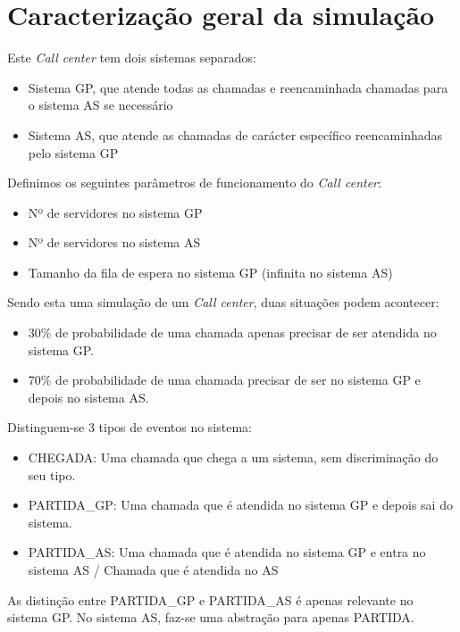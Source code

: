 \section*{Caracterização geral da simulação}

\noindent
Este \textit{Call center} tem dois sistemas separados:
\begin{itemize}
    \item Sistema GP, que atende todas as chamadas e reencaminhada chamadas para o sistema AS se necessário
    \item Sistema AS, que atende as chamadas de carácter específico reencaminhadas pelo sistema GP
\end{itemize}

\noindent
Definimos os seguintes parâmetros de funcionamento do \textit{Call center}:
\begin{itemize}
    \item Nº de servidores no sistema GP
    \item Nº de servidores no sistema AS
    \item Tamanho da fila de espera no sistema GP (infinita no sistema AS)
\end{itemize}


\noindent
Sendo esta uma simulação de um \textit{Call center}, duas situações podem acontecer:
\begin{itemize}
    \item 30\% de probabilidade de uma chamada apenas precisar de ser atendida no sistema GP.
    \item 70\% de probabilidade de uma chamada precisar de ser no sistema GP e depois no sistema AS.
\end{itemize}


\noindent
Distinguem-se 3 tipos de eventos no sistema:
\begin{itemize}
    \item CHEGADA: Uma chamada que chega a um sistema, sem discriminação do seu tipo.
    \item PARTIDA\_GP: Uma chamada que é atendida no sistema GP e depois sai do sistema.
    \item PARTIDA\_AS: Uma chamada que é atendida no sistema GP e entra no sistema AS / Chamada que é atendida no AS
\end{itemize}

As distinção entre PARTIDA\_GP e PARTIDA\_AS é apenas relevante no sistema GP. No sistema AS, faz-se uma abstração para apenas PARTIDA.

